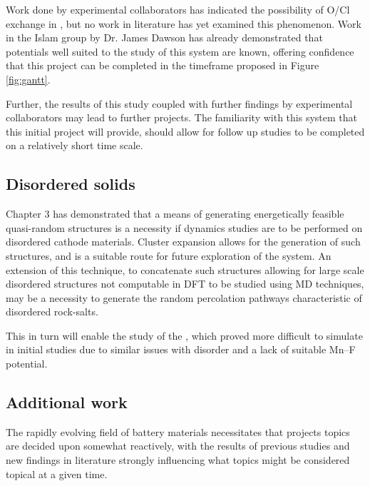 Work done by experimental collaborators has indicated the possibility of O/Cl exchange in , but no work in literature has yet examined this phenomenon.
Work in the Islam group by Dr. James Dawson has already demonstrated that potentials well suited to the study of this system are known, offering confidence that this project can be completed in the timeframe proposed in Figure \ref{fig:gantt}.

Further, the results of this study coupled with further findings by experimental collaborators may lead to further projects.
The familiarity with this system that this initial project will provide, should allow for follow up studies to be completed on a relatively short time scale.

\subsection{Disordered solids}
Chapter 3 has demonstrated that a means of generating energetically feasible quasi-random structures is a necessity if dynamics studies are to be performed on disordered cathode materials.
Cluster expansion\cite{Chang2019} allows for the generation of such structures, and is a suitable route for future exploration of the system.
An extension of this technique, to concatenate such structures allowing for large scale disordered structures not computable in DFT to be studied using MD techniques, may be a necessity to generate the random percolation pathways characteristic of disordered rock-salts.

This in turn will enable the study of the , which proved more difficult to simulate in initial studies due to similar issues with disorder and a lack of suitable Mn--F potential.

\subsection{Additional work}
The rapidly evolving field of battery materials necessitates that projects topics are decided upon somewhat reactively, with the results of previous studies and new findings in literature strongly influencing what topics might be considered topical at a given time.

